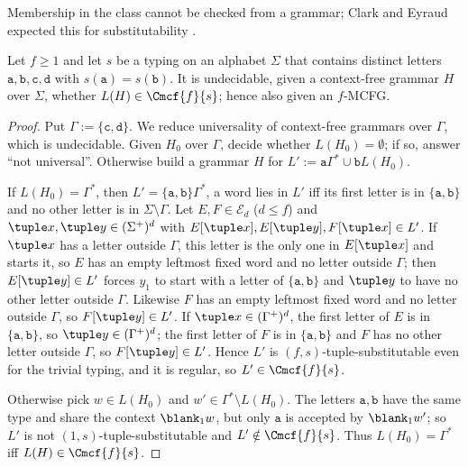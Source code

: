 
Membership in the class cannot be checked from a grammar; Clark and Eyraud
expected this for substitutability \cite[p.~1743]{ClarkEyraud2007}.

\begin{proposition}
\label{prop:class-undecidable}
Let $f\ge1$ and let $s$ be a typing on an alphabet $\Sigma$ that contains
distinct letters $\mathtt a,\mathtt b,\mathtt c,\mathtt d$ with
$s(\mathtt a)=s(\mathtt b)$.  It is undecidable, given a context-free grammar
$H$ over $\Sigma$, whether $L(H)\in\Cmcf{f}{s}$; hence also given an $f$-MCFG.
\end{proposition}

\begin{proof}
Put $\Gamma:=\{\mathtt c,\mathtt d\}$.  We reduce universality of context-free
grammars over $\Gamma$, which is undecidable.  Given $H_0$ over $\Gamma$, decide
whether $L(H_0)=\emptyset$; if so, answer ``not universal''.  Otherwise build
a grammar $H$ for $L':=\mathtt a\Gamma^*\cup\mathtt bL(H_0)$.

If $L(H_0)=\Gamma^*$, then $L'=\{\mathtt a,\mathtt b\}\Gamma^*$, a word lies in $L'$
iff its first letter is in $\{\mathtt a,\mathtt b\}$ and no other letter is in
$\Sigma\setminus\Gamma$.  Let $E,F\in\mathcal E_d$ ($d\le f$) and
$\tuple x,\tuple y\in(\Sigma^+)^d$ with $E[\tuple x],E[\tuple y],F[\tuple x]\in L'$.
If $\tuple x$ has a letter outside $\Gamma$, this letter is the only one in
$E[\tuple x]$ and starts it, so $E$ has an empty leftmost fixed word and no letter
outside $\Gamma$; then $E[\tuple y]\in L'$ forces $y_1$ to start with a letter of
$\{\mathtt a,\mathtt b\}$ and $\tuple y$ to have no other letter outside $\Gamma$.
Likewise $F$ has an empty leftmost fixed word and no letter outside $\Gamma$, so
$F[\tuple y]\in L'$.  If $\tuple x\in(\Gamma^+)^d$, the first letter of
$E$ is in $\{\mathtt a,\mathtt b\}$, so $\tuple y\in(\Gamma^+)^d$; the first letter of
$F$ is in $\{\mathtt a,\mathtt b\}$ and $F$ has no other letter outside $\Gamma$, so
$F[\tuple y]\in L'$.  Hence $L'$ is $(f,s)$-tuple-substitutable even for the
trivial typing, and it is regular, so $L'\in\Cmcf{f}{s}$.

Otherwise pick $w\in L(H_0)$ and $w'\in\Gamma^*\setminus L(H_0)$.  The letters
$\mathtt a,\mathtt b$ have the same type and share the context $\blank_1w$, but only
$\mathtt a$ is accepted by $\blank_1w'$; so $L'$ is not
$(1,s)$-tuple-substitutable and $L'\notin\Cmcf{f}{s}$.  Thus
$L(H_0)=\Gamma^*$ iff $L(H)\in\Cmcf{f}{s}$.
\end{proof}

